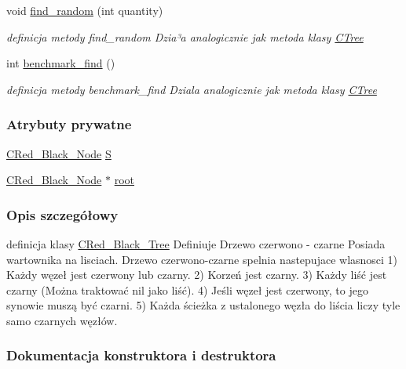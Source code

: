 \begin{DoxyCompactItemize}
void \hyperlink{class_c_red___black___tree_a538381769d077c7e99e077b356f7da4b}{find\+\_\+random} (int quantity)
\begin{DoxyCompactList}\small\item\em definicja metody find\+\_\+random Dzia³a analogicznie jak metoda klasy \hyperlink{class_c_tree}{C\+Tree} \end{DoxyCompactList}\item 
int \hyperlink{class_c_red___black___tree_a1d7ba7f00afaeca269eeb47c371fde04}{benchmark\+\_\+find} ()
\begin{DoxyCompactList}\small\item\em definicja metody benchmark\+\_\+find Dziala analogicznie jak metoda klasy \hyperlink{class_c_tree}{C\+Tree} \end{DoxyCompactList}\end{DoxyCompactItemize}
\subsubsection*{Atrybuty prywatne}
\begin{DoxyCompactItemize}
\item 
\hyperlink{class_c_red___black___node}{C\+Red\+\_\+\+Black\+\_\+\+Node} \hyperlink{class_c_red___black___tree_abfd1055bef2171bd6af469d0224997ae}{S}
\item 
\hyperlink{class_c_red___black___node}{C\+Red\+\_\+\+Black\+\_\+\+Node} $\ast$ \hyperlink{class_c_red___black___tree_ac431b055315c6869490c71869d40e29a}{root}
\end{DoxyCompactItemize}


\subsubsection{Opis szczegółowy}
definicja klasy \hyperlink{class_c_red___black___tree}{C\+Red\+\_\+\+Black\+\_\+\+Tree} Definiuje Drzewo czerwono -\/ czarne Posiada wartownika na lisciach. Drzewo czerwono-\/czarne spelnia nastepujace wlasnosci 1) Każdy węzeł jest czerwony lub czarny. 2) Korzeń jest czarny. 3) Każdy liść jest czarny (Można traktować nil jako liść). 4) Jeśli węzeł jest czerwony, to jego synowie muszą być czarni. 5) Każda ścieżka z ustalonego węzła do liścia liczy tyle samo czarnych węzłów. 

\subsubsection{Dokumentacja konstruktora i destruktora}
\hypertarget{class_c_red___black___tree_a03a4710e80b0315403d8fcd447328152}{}
